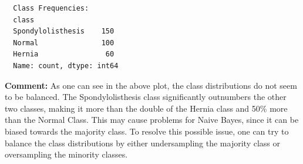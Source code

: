 \documentclass{article}
\begin{document}
\begin{lstlisting}
  Class Frequencies:
  class
  Spondylolisthesis    150
  Normal               100
  Hernia                60
  Name: count, dtype: int64
\end{lstlisting}

\textbf{Comment:}
As one can see in the above plot, the class distributions do not seem to be balanced. The Spondylolisthesis class significantly outnumbers the other two classes, making it more than the double of the Hernia class and 50\% more than the Normal Class. This may cause problems for Naive Bayes, since it can be biased towards the majority class. To resolve this possible issue, one can try to balance the class distributions by either undersampling the majority class or oversampling the minority classes.
\end{document}
